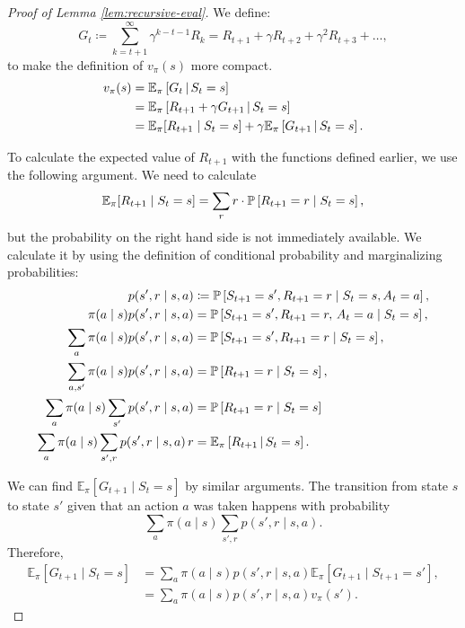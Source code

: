 \begin{proof}[Proof of Lemma \ref{lem:recursive-eval}]
	We define:
	\[
		G_t \coloneqq \sum_{k=t+1}^{\infty} \gamma^{k-t-1} R_k = R_{t+1} + \gamma R_{t+2} + \gamma^{2} R_{t+3} + \dots, 
	\]
	to make the definition of $v_\pi (s)$ more compact.
	\begin{align}
		v_\pi (s) &= \mathbb{E}_\pi \left[ G_t \,\middle\vert\, S_t = s \right] \nonumber \\
		&= \mathbb{E}_\pi \left[ R_{t+1} + \gamma G_{t+1} \,\middle\vert\, S_t = s \right] \nonumber \\
		\label{eq:paso-2}
		&= \mathbb{E}_\pi [R_{t+1} \mid S_t = s] + \gamma \mathbb{E}_\pi \left[ G_{t+1} \,\middle\vert\, S_{t} = s \right].
	\end{align}

	To calculate the expected value of $R_{t+1}$ with the functions defined
	earlier, we use the following argument. We need to calculate
	\[
		\mathbb{E}_\pi [R_{t+1} \mid S_t = s] = \sum_{r} r \cdot \mathbb{P}\left[R_{t+1} = r \mid S_t = s\right],
	\]
	but the probability on the right hand side is not immediately available. We
	calculate it by using the definition of conditional probability and
	marginalizing probabilities:
	\begin{align}
		p(s', r \mid s, a) &\coloneqq \mathbb{P}\left[S_{t+1} = s', R_{t+1} = r \mid S_t = s, A_t = a\right], \nonumber \\
		\pi(a \mid s) p(s', r \mid s, a) &= \mathbb{P}\left[S_{t+1} = s', R_{t+1} = r, \, A_t = a \mid S_{t} = s\right], \nonumber \\
		\sum_{a} \pi(a \mid s) p(s', r \mid s, a) &= \mathbb{P}\left[S_{t+1} = s', R_{t+1} = r \mid S_{t} = s\right], \nonumber \\
		\sum_{a, s'} \pi(a \mid s) p(s', r \mid s, a) &= \mathbb{P}\left[R_{t+1} = r \mid S_{t} = s\right] , \nonumber\\
		\sum_{a} \pi(a \mid s) \sum_{s'} p(s', r \mid s, a) &=  \mathbb{P}\left[R_{t+1} = r \mid S_{t} = s\right] \nonumber \\
		\sum_{a} \pi(a \mid s) \sum_{s', r} p(s', r \mid s, a) \, r &= \mathbb{E}_\pi \left[ R_{t+1} \,\middle\vert\, S_t = s \right]. \label{eq:cacho-uno}
	\end{align}

	We can find $\mathbb{E}_\pi [G_{t+1} \mid S_t = s]$ by similar arguments.
	The transition from state $s$ to state $s'$ given that an action $a$ was
	taken happens with probability
	\[
		\sum_a \pi(a \mid s) \sum_{s', r} p(s', r \mid s, a).
	\]
	Therefore,
	\begin{align}
		\label{eq:cacho-dos}
		\mathbb{E}_\pi [G_{t+1} \mid S_t = s] &= \sum_a \pi(a \mid s) p(s', r \mid s, a) \mathbb{E}_\pi \left[ G_{t+1} \mid S_{t+1} = s' \right], \nonumber \\
		&= \sum_a \pi(a \mid s) p(s', r \mid s, a) v_\pi (s').
	\end{align}


\end{proof}
